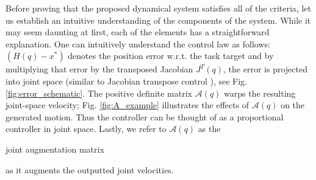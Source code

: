 \documentclass[letterpaper, 10 pt, conference,fleqn]{ieeeconf}
\begin{document}
Before proving that the proposed dynamical system satisfies all of the criteria, let us establish an intuitive understanding of the components of the system. While it may seem daunting at first, each of the elements has a straightforward explanation. One can intuitively understand the control law as follows: $(H(q) - x^*)$ denotes the position error w.r.t. the task target and by multiplying that error by the transposed Jacobian $J^T(q)$, the error is projected into joint space (similar to Jacobian transpose control \cite{wolovich1984computational,sciavicco1988solution}), see Fig. \ref{fig:error_schematic}. The positive definite matrix $\mathcal{A}(q)$ warps the resulting joint-space velocity; Fig. \ref{fig:A_example} illustrates the effects of  $\mathcal{A}(q)$ on the generated motion. Thus the controller can be thought of as a proportional controller in joint space. Lastly, we refer to %
$\mathcal{A}(q)$ as the \begin{bf} joint augmentation matrix \end{bf} as it augments the outputted joint velocities.
\end{document}

